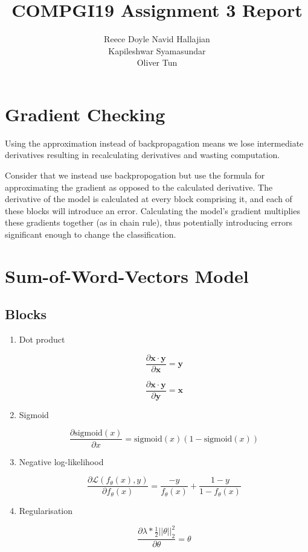 \documentclass{article} %
\title{COMPGI19 Assignment 3 Report}
\author{
Reece Doyle
\And
Navid Hallajian \\
\And
Kapileshwar Syamasundar \\
\And
Oliver Tun \\
}
\begin{document}
\maketitle

\section{Gradient Checking}
Using the approximation instead of backpropagation means we lose intermediate derivatives resulting in recalculating derivatives and wasting computation.

Consider that we instead use backpropogation but use the formula for approximating the gradient as opposed to the calculated derivative. The derivative of the model is calculated at every block comprising it, and each of these blocks will introduce an error. Calculating the model's gradient multiplies these gradients together (as in chain rule), thus potentially introducing errors significant enough to change the classification. 

\section{Sum-of-Word-Vectors Model}

\subsection{Blocks}

\begin{enumerate}

\item Dot product

\[ \frac{\partial {\mathbf{x} \cdot \mathbf{y}}}{\partial{\mathbf{x}}} = \mathbf{y}  \]

\[ \frac{\partial {\mathbf{x} \cdot \mathbf{y}}}{\partial{\mathbf{y}}} = \mathbf{x} \]

\item Sigmoid

\[ \frac{\partial \text{sigmoid} (x)}{\partial{x}} =  \text{sigmoid}(x) (1 - \text{sigmoid}(x))\]

\item Negative log-likelihood

\[ \frac{\partial \mathcal{L}(f_{\theta}(x), y)}{\partial{f_{\theta}(x)}} = \frac{-y}{f_{\theta}(x)} + \frac{1 - y}{1 - f_{\theta}(x)} \]

\item Regularisation

\[ \frac{\partial \lambda * \frac{1}{2} {|| \theta ||}^2_2}{\partial \theta} = \theta \]

\end{enumerate}
\end{document}
